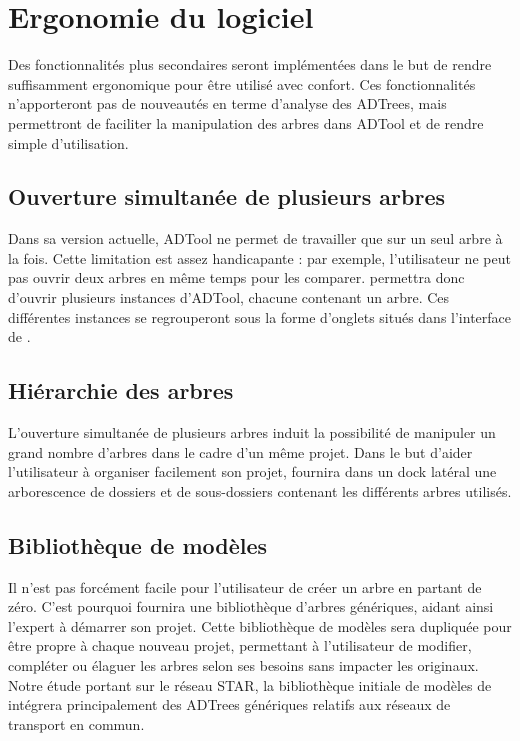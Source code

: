 \section{Ergonomie du logiciel}
    Des fonctionnalités plus secondaires seront implémentées dans le but de rendre \glasir{} suffisamment ergonomique pour être utilisé avec confort. Ces fonctionnalités n'apporteront pas de nouveautés en terme d'analyse des ADTrees, mais permettront de faciliter la manipulation des arbres dans ADTool et de rendre \glasir{} simple d'utilisation. 

    \subsection{Ouverture simultanée de plusieurs arbres}
        Dans sa version actuelle, ADTool ne permet de travailler que sur un seul arbre à la fois. Cette limitation est assez handicapante : par exemple, l'utilisateur ne peut pas ouvrir deux arbres en même temps pour les comparer. \glasir{} permettra donc d'ouvrir plusieurs instances d'ADTool, chacune contenant un arbre. Ces différentes instances se regrouperont sous la forme d'onglets situés dans l'interface de \glasir{}.
    
    \subsection{Hiérarchie des arbres}
        L'ouverture simultanée de plusieurs arbres induit la possibilité de manipuler un grand nombre d'arbres dans le cadre d'un même projet. Dans le but d'aider l'utilisateur à organiser facilement son projet, \glasir{} fournira dans un dock latéral une arborescence de dossiers et de sous-dossiers contenant les différents arbres utilisés.

    \subsection{Bibliothèque de modèles}
        Il n'est pas forcément facile pour l'utilisateur de créer un arbre en partant de zéro. C'est pourquoi \glasir{} fournira une bibliothèque d'arbres génériques, aidant ainsi l'expert à démarrer son projet. Cette bibliothèque de modèles sera dupliquée pour être propre à chaque nouveau projet, permettant à l'utilisateur de modifier, compléter ou élaguer les arbres selon ses besoins sans impacter les originaux. Notre étude portant sur le réseau STAR, la bibliothèque initiale de modèles de \glasir{} intégrera principalement des ADTrees génériques relatifs aux réseaux de transport en commun. 


